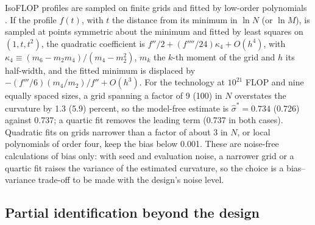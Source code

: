 \begin{remark}\label{rem:A-grid}
IsoFLOP profiles are sampled on finite grids and fitted by low-order polynomials \citep{czech2026problems}. If the profile
$f(t)$, with $t$ the distance from its minimum in $\ln N$ (or $\ln M$), is sampled at points symmetric about the minimum
and fitted by least squares on $(1,t,t^2)$, the quadratic coefficient is $f''/2+(f''''/24)\kappa_4+O(h^4)$, with
$\kappa_4\equiv(m_6-m_2m_4)/(m_4-m_2^2)$, $m_k$ the $k$-th moment of the grid and $h$ its half-width, and the fitted minimum
is displaced by $-(f'''/6)(m_4/m_2)/f''+O(h^3)$. For the \citet{besiroglu2024chinchilla} technology at $10^{21}$ FLOP and nine
equally spaced sizes, a grid spanning a factor of 9 (100) in $N$ overstates the curvature by 1.3 (5.9) percent, so the
model-free estimate is $\hat\sigma^*=0.734$ (0.726) against 0.737; a quartic fit removes the leading term (0.737 in both
cases). Quadratic fits on grids narrower than a factor of about 3 in $N$, or local polynomials of order four, keep the bias
below 0.001. These are noise-free calculations of bias only: with seed and evaluation noise, a narrower grid or a quartic
fit raises the variance of the estimated curvature, so the choice is a bias--variance trade-off to be made with the design's
noise level.
\end{remark}

\subsection{Partial identification beyond the design}\label{app:pi}

